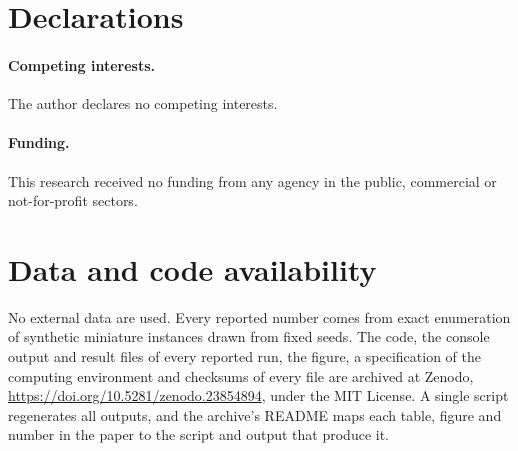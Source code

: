 \documentclass[pdflatex,sn-mathphys-num]{sn-jnl}
\theoremstyle{thmstyleone}
\theoremstyle{thmstyletwo}
\theoremstyle{thmstylethree}
\begin{document}
\section*{Declarations}

\paragraph{Competing interests.} The author declares no competing interests.

\paragraph{Funding.} This research received no funding from any agency in the
public, commercial or not-for-profit sectors.

\section*{Data and code availability}

No external data are used. Every reported number comes from exact
enumeration of synthetic miniature instances drawn from fixed seeds. The
code, the console output and result files of every reported run, the figure,
a specification of the computing environment and checksums of every file are
archived at Zenodo, \url{https://doi.org/10.5281/zenodo.23854894}, under the
MIT License. A single script regenerates all outputs, and the archive's
README maps each table, figure and number in the paper to the script and
output that produce it.
\end{document}
